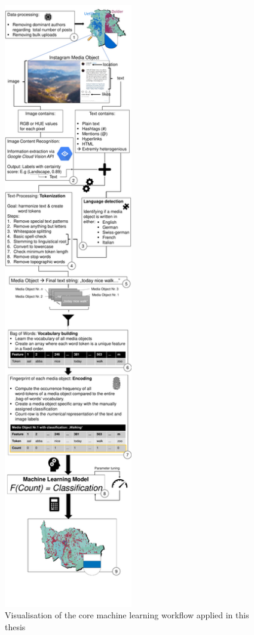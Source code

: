 \begin{figure}[h]
   \centering
   \includegraphics[width=0.5\textwidth]{img/ML_text_data_visualization}
   \caption{Visualisation of the core machine learning workflow applied in this thesis}
   \label{fig:ml_visualisation}
\end{figure}

